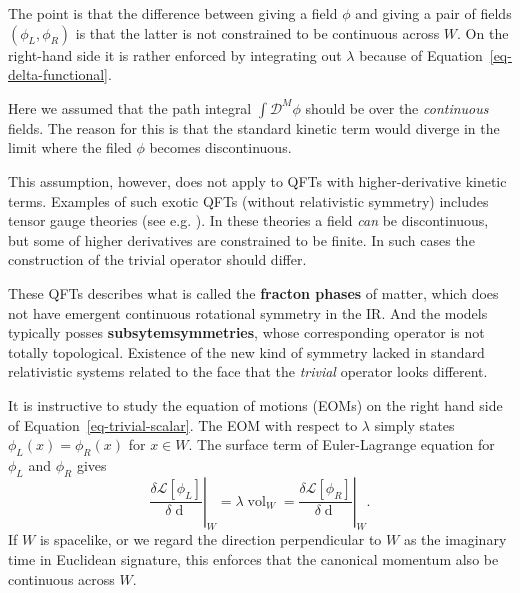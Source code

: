 \documentclass[
  letterpaper,
  DIV=11,
  numbers=noendperiod]{scrreport}
\DeclareMathOperator{\vol}{vol}
\begin{document}
The point is that the difference between giving a field \(\phi\) and
giving a pair of fields \((\phi_L,\phi_R)\) is that the latter is not
constrained to be continuous across \(W\). On the right-hand side it is
rather enforced by integrating out \(\lambda\) because of
Equation~\ref{eq-delta-functional}.

\begin{tcolorbox}[enhanced jigsaw, bottomtitle=1mm, colback=white, toprule=.15mm, coltitle=black, opacityback=0, toptitle=1mm, arc=.35mm, left=2mm, title=\textcolor{quarto-callout-tip-color}{\faLightbulb}\hspace{0.5em}{\textsf{Continuity of fields in ``exotic'' QFTs and subsystem symmetry}}, rightrule=.15mm, titlerule=0mm, leftrule=.75mm, colbacktitle=quarto-callout-tip-color!10!white, opacitybacktitle=0.6, breakable, bottomrule=.15mm, colframe=quarto-callout-tip-color-frame]

Here we assumed that the path integral \(\int\mathcal{D}^M\phi\) should
be over the \emph{continuous} fields. The reason for this is that the
standard kinetic term would diverge in the limit where the filed
\(\phi\) becomes discontinuous.

This assumption, however, does not apply to QFTs with higher-derivative
kinetic terms. Examples of such exotic QFTs (without relativistic
symmetry) includes tensor gauge theories (see e.g.
\autocite{Pretko:2020cko,Seiberg:2020bhn}). In these theories a field
\emph{can} be discontinuous, but some of higher derivatives are
constrained to be finite. In such cases the construction of the trivial
operator should differ.

These QFTs describes what is called the \textbf{fracton phases} of
matter, which does not have emergent continuous rotational symmetry in
the IR. And the models typically posses \textbf{subsytemsymmetries},
whose corresponding operator is not totally topological. Existence of
the new kind of symmetry lacked in standard relativistic systems related
to the face that the \emph{trivial} operator looks different.

\end{tcolorbox}

It is instructive to study the equation of motions (EOMs) on the right
hand side of Equation~\ref{eq-trivial-scalar}. The EOM with respect to
\(\lambda\) simply states \(\phi_L(x) = \phi_R(x)\) for \(x\in W\). The
surface term of Euler-Lagrange equation for \(\phi_L\) and \(\phi_R\)
gives \[
    \left.\frac{\delta \mathcal{L}[\phi_L]}{\delta \mathop{d\phi_L}}\right|_W = \lambda \vol_W = \left. \frac{\delta \mathcal{L}[\phi_R]}{\delta \mathop{d \phi_R}}\right|_W.
\] If \(W\) is spacelike, or we regard the direction perpendicular to
\(W\) as the imaginary time in Euclidean signature, this enforces that
the canonical momentum also be continuous across \(W\).
\end{document}
